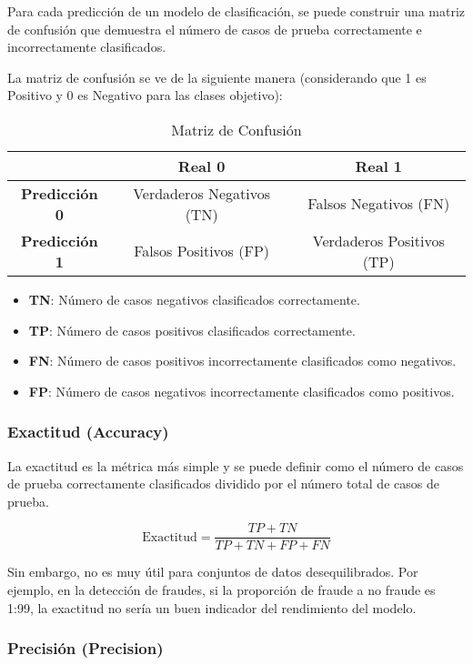 Para cada predicción de un modelo de clasificación, se puede construir una matriz de confusión que demuestra el número de casos de prueba correctamente e incorrectamente clasificados.

La matriz de confusión se ve de la siguiente manera (considerando que 1 es Positivo y 0 es Negativo para las clases objetivo):

\begin{table}[h]
	\centering
	\begin{tabular}{|c|c|c|}
		\hline
		& \textbf{Real 0} & \textbf{Real 1} \\ \hline
		\textbf{Predicción 0} & Verdaderos Negativos (TN) & Falsos Negativos (FN) \\ \hline
		\textbf{Predicción 1} & Falsos Positivos (FP) & Verdaderos Positivos (TP) \\ \hline
	\end{tabular}
	\caption{Matriz de Confusión}
\end{table}

\begin{itemize}
	\item \textbf{TN}: Número de casos negativos clasificados correctamente.
	\item \textbf{TP}: Número de casos positivos clasificados correctamente.
	\item \textbf{FN}: Número de casos positivos incorrectamente clasificados como negativos.
	\item \textbf{FP}: Número de casos negativos incorrectamente clasificados como positivos.
\end{itemize}

\subsubsection{Exactitud (Accuracy)}

La exactitud es la métrica más simple y se puede definir como el número de casos de prueba correctamente clasificados dividido por el número total de casos de prueba.

\[
\text{Exactitud} = \frac{TP + TN}{TP + TN + FP + FN}
\]

Sin embargo, no es muy útil para conjuntos de datos desequilibrados. Por ejemplo, en la detección de fraudes, si la proporción de fraude a no fraude es 1:99, la exactitud no sería un buen indicador del rendimiento del modelo.

\subsubsection{Precisión (Precision)}

